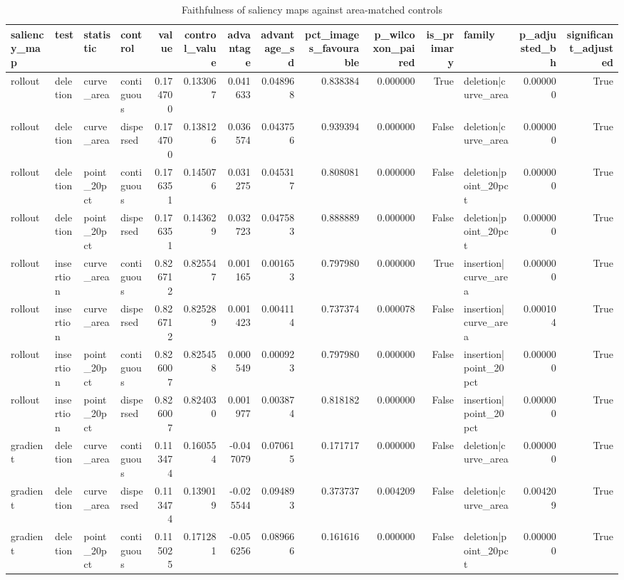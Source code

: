 \begin{table}
\caption{Faithfulness of saliency maps against area-matched controls}
\begin{tabular}{llllrrrrrrrlrr}
\toprule
saliency\_map & test & statistic & control & value & control\_value & advantage & advantage\_sd & pct\_images\_favourable & p\_wilcoxon\_paired & is\_primary & family & p\_adjusted\_bh & significant\_adjusted \\
\midrule
rollout & deletion & curve\_area & contiguous & 0.174700 & 0.133067 & 0.041633 & 0.048968 & 0.838384 & 0.000000 & True & deletion|curve\_area & 0.000000 & True \\
rollout & deletion & curve\_area & dispersed & 0.174700 & 0.138126 & 0.036574 & 0.043756 & 0.939394 & 0.000000 & False & deletion|curve\_area & 0.000000 & True \\
rollout & deletion & point\_20pct & contiguous & 0.176351 & 0.145076 & 0.031275 & 0.045317 & 0.808081 & 0.000000 & False & deletion|point\_20pct & 0.000000 & True \\
rollout & deletion & point\_20pct & dispersed & 0.176351 & 0.143629 & 0.032723 & 0.047583 & 0.888889 & 0.000000 & False & deletion|point\_20pct & 0.000000 & True \\
rollout & insertion & curve\_area & contiguous & 0.826712 & 0.825547 & 0.001165 & 0.001653 & 0.797980 & 0.000000 & True & insertion|curve\_area & 0.000000 & True \\
rollout & insertion & curve\_area & dispersed & 0.826712 & 0.825289 & 0.001423 & 0.004114 & 0.737374 & 0.000078 & False & insertion|curve\_area & 0.000104 & True \\
rollout & insertion & point\_20pct & contiguous & 0.826007 & 0.825458 & 0.000549 & 0.000923 & 0.797980 & 0.000000 & False & insertion|point\_20pct & 0.000000 & True \\
rollout & insertion & point\_20pct & dispersed & 0.826007 & 0.824030 & 0.001977 & 0.003874 & 0.818182 & 0.000000 & False & insertion|point\_20pct & 0.000000 & True \\
gradient & deletion & curve\_area & contiguous & 0.113474 & 0.160554 & -0.047079 & 0.070615 & 0.171717 & 0.000000 & False & deletion|curve\_area & 0.000000 & True \\
gradient & deletion & curve\_area & dispersed & 0.113474 & 0.139019 & -0.025544 & 0.094893 & 0.373737 & 0.004209 & False & deletion|curve\_area & 0.004209 & True \\
gradient & deletion & point\_20pct & contiguous & 0.115025 & 0.171281 & -0.056256 & 0.089666 & 0.161616 & 0.000000 & False & deletion|point\_20pct & 0.000000 & True \\

\end{tabular}
\end{table}
